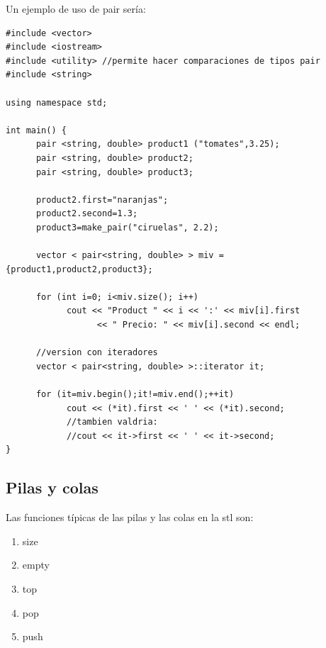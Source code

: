 \documentclass[10pt,a4paper,spanish]{report}
\begin{document}
\noindent
Un ejemplo de uso de pair sería:
\begin{verbatim}
#include <vector>
#include <iostream>
#include <utility> //permite hacer comparaciones de tipos pair
#include <string>

using namespace std;

int main() {
      pair <string, double> product1 ("tomates",3.25);
      pair <string, double> product2;
      pair <string, double> product3;

      product2.first="naranjas";
      product2.second=1.3;
      product3=make_pair("ciruelas", 2.2);

      vector < pair<string, double> > miv = {product1,product2,product3};

      for (int i=0; i<miv.size(); i++)
            cout << "Product " << i << ':' << miv[i].first
                  << " Precio: " << miv[i].second << endl;

      //version con iteradores
      vector < pair<string, double> >::iterator it;

      for (it=miv.begin();it!=miv.end();++it)
            cout << (*it).first << ' ' << (*it).second;
            //tambien valdria:
            //cout << it->first << ' ' << it->second;
}
\end{verbatim}

\subsection{\textcolor[rgb]{0.2,0.5,0.5}Pilas y colas}
\noindent
Las funciones típicas de las pilas y las colas en la stl son:
\begin{enumerate}[$\longrightarrow$]
\item size
\item empty
\item top
\item pop
\item push
\end{enumerate}
\end{document}

